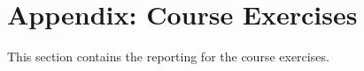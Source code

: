 \section{Appendix: Course Exercises}
This section contains the reporting for the course exercises.


